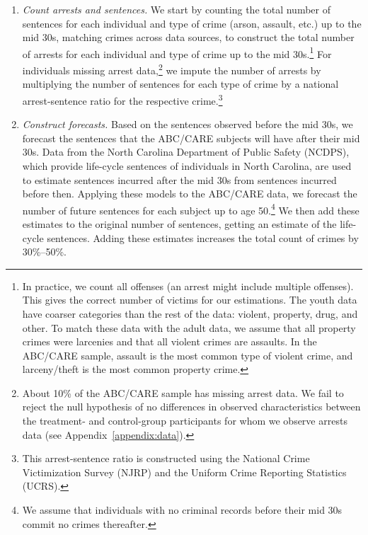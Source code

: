 \begin{enumerate}
\item \textit{Count arrests and sentences.} We start by counting the total number of sentences for each individual and type of crime (arson, assault, etc.) up to the mid 30s, matching crimes across data sources, to construct the total number of  arrests for each individual and type of crime up to the mid 30s.\footnote{In practice, we count all offenses (an arrest might include multiple offenses). This gives the correct number of victims for our estimations. The youth data have coarser categories than the rest of the data: violent, property, drug, and other. To match these data with the adult data, we assume that all property crimes were larcenies and that all violent crimes are assaults. In the ABC/CARE sample, assault is the most common type of violent crime, and larceny/theft is the most common property crime.} For individuals missing arrest data,\footnote{About 10\% of the ABC/CARE sample has missing arrest data. We fail to reject the null hypothesis of no differences in observed characteristics between the treatment- and control-group participants for whom we observe arrests data (see  Appendix~\ref{appendix:data}).} we impute the number of arrests by multiplying the number of sentences for each type of crime by a national arrest-sentence ratio for the respective crime.\footnote{This arrest-sentence ratio is constructed using the National Crime Victimization Survey (NJRP) and the Uniform Crime Reporting Statistics (UCRS).}

\item \textit{Construct forecasts.} Based on the sentences observed before the mid 30s, we forecast the sentences that the ABC/CARE subjects will have after their mid 30s. Data from the North Carolina Department of Public Safety (NCDPS), which provide life-cycle sentences of individuals in North Carolina, are used to estimate sentences incurred after the mid 30s from sentences incurred before then. Applying these models to the ABC/CARE data, we forecast the number of future sentences for each subject up to age 50.\footnote{We assume that individuals with no criminal records before their mid 30s commit no crimes thereafter.} We then add these estimates to the original number of sentences, getting an estimate of the life-cycle sentences. Adding these estimates increases the total count of crimes by 30\%--50\%.


\end{enumerate}
